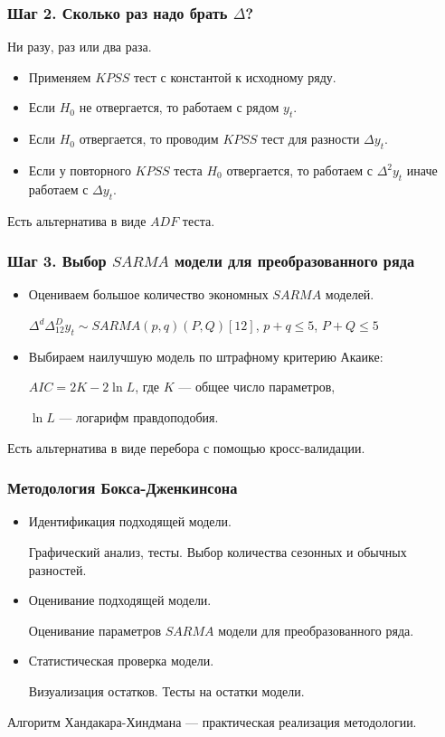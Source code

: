 \begin{frame}
  \frametitle{Шаг 2. Сколько раз надо брать $\Delta$?}

  Ни разу, раз или два раза.
  \pause
  \begin{itemize}[<+->]
    \item Применяем $KPSS$ тест с константой к исходному ряду. 
  
    \item Если $H_0$ не отвергается, то работаем с рядом $y_t$. 

    \item Если $H_0$ отвергается, то проводим $KPSS$ тест для разности $\Delta y_t$.

    \item Если у повторного $KPSS$ теста $H_0$ отвергается, то работаем с $\Delta^2 y_t$
    иначе работаем с $\Delta y_t$.
  \end{itemize}
  \pause 
  Есть альтернатива в виде $ADF$ теста.

\end{frame}

\begin{frame}
  \frametitle{Шаг 3. Выбор $SARMA$ модели для преобразованного ряда}

  \begin{itemize}[<+->]
    \item Оцениваем большое количество экономных $SARMA$ моделей.
    
    $\Delta^d \Delta^D_{12} y_t \sim SARMA(p, q)(P, Q) [12]$, $p + q \leq 5$, $P + Q \leq 5$
    \item Выбираем наилучшую модель по штрафному критерию Акаике:
    
    $AIC = 2 K - 2 \ln L$, где $K$ — общее число параметров,  
    
    $\ln L$ — логарифм правдоподобия.
  \end{itemize}

  \pause
  Есть альтернатива в виде перебора с помощью кросс-валидации. 
  

\end{frame}


\begin{frame}
  \frametitle{Методология Бокса-Дженкинсона}

  \begin{itemize}[<+->]
    \item Идентификация подходящей модели. 
    
    Графический анализ, тесты. Выбор количества сезонных и обычных разностей.
    \item Оценивание подходящей модели.
    
    Оценивание параметров $SARMA$ модели для преобразованного ряда. 

    \item Статистическая проверка модели. 
    
    Визуализация остатков. Тесты на остатки модели.
  \end{itemize}
  
  \pause  
  Алгоритм Хандакара-Хиндмана — практическая реализация методологии.

\end{frame}


